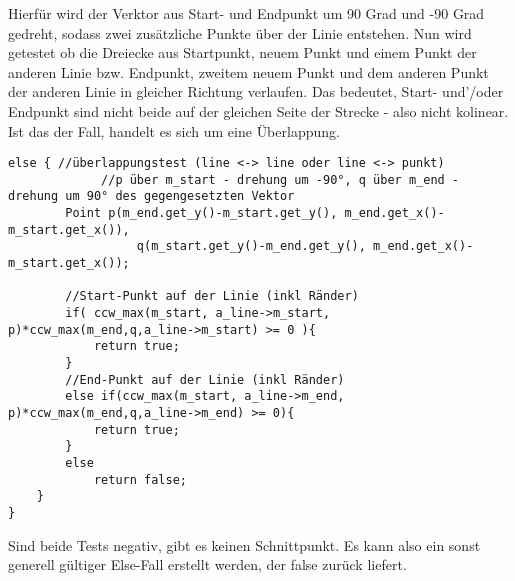 Hierfür wird der Verktor aus Start- und Endpunkt um 90 Grad und -90 Grad gedreht, sodass zwei zusätzliche Punkte über der Linie entstehen. Nun wird getestet ob die Dreiecke aus Startpunkt, neuem Punkt und einem Punkt der anderen Linie bzw. Endpunkt, zweitem neuem Punkt und dem anderen Punkt der anderen Linie in gleicher Richtung verlaufen. Das bedeutet, Start- und'/oder Endpunkt sind nicht beide auf der gleichen Seite der Strecke - also nicht kolinear.
Ist das der Fall, handelt es sich um eine \"Uberlappung.
\begin{lstlisting}
else { //überlappungstest (line <-> line oder line <-> punkt)
			 //p über m_start - drehung um -90°, q über m_end - drehung um 90° des gegengesetzten Vektor
		Point p(m_end.get_y()-m_start.get_y(), m_end.get_x()-m_start.get_x()),
				  q(m_start.get_y()-m_end.get_y(), m_end.get_x()-m_start.get_x());

		//Start-Punkt auf der Linie (inkl Ränder)
		if( ccw_max(m_start, a_line->m_start, p)*ccw_max(m_end,q,a_line->m_start) >= 0 ){
			return true;
		}
		//End-Punkt auf der Linie (inkl Ränder)
		else if(ccw_max(m_start, a_line->m_end, p)*ccw_max(m_end,q,a_line->m_end) >= 0){
			return true;
		}
		else
			return false;
	}
}
\end{lstlisting}

Sind beide Tests negativ, gibt es keinen Schnittpunkt. Es kann also ein sonst generell gültiger Else-Fall erstellt werden, der false zurück liefert.

\label{subsec:A1_Schnittpunkte}


